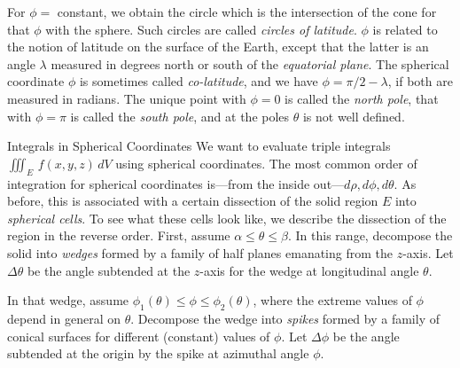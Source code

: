 For $\phi = $ constant, we obtain the circle which is the
intersection of the cone for that $\phi$ with the sphere.
Such circles are called {\it circles of latitude}.
%
%
$\phi$ is related to the notion of latitude on the surface
of the Earth, except that the latter is an angle $\lambda$
 measured
in degrees north or south of the {\it equatorial plane}.  The
spherical coordinate $\phi$ is sometimes called {\it co-latitude\/},
and we have $\phi = \pi/2 - \lambda$, if both are measured in
radians.  The unique point with $\phi = 0$ is called the
{\it north pole\/}, that with $\phi = \pi$ is called the
{\it south pole\/}, and at the  poles $\theta$ is not well defined.
\medskip
\centerline{}
\medskip
\subhead Integrals in Spherical Coordinates \endsubhead
We want to evaluate  triple integrals $\iiint_E\,f(x,y,z)\,dV$
using spherical coordinates.
The most common order of integration for spherical coordinates
is---from the inside out---$d\rho, d\phi, d\theta$.  
As before, this is associated with a certain dissection of the
solid region $E$ into {\it spherical cells}.  To see what these
cells look like, we describe the dissection of the region in
the reverse order.   First, assume $\alpha \le \theta \le \beta$.
In this range, decompose the solid  into {\it wedges\/}
formed by a family of half planes emanating from the $z$-axis.
Let $\Delta\theta$ be the angle subtended at the $z$-axis for the
wedge at longitudinal
angle $\theta$.
\medskip
\centerline{}
\medskip
In that wedge, assume 
$\phi_1(\theta)\le \phi \le \phi_2(\theta)$, where the
extreme values of $\phi$ depend in general
on $\theta$.  Decompose the wedge into {\it spikes\/} formed
by a family of conical surfaces for different (constant) values
of $\phi$.  Let $\Delta \phi$ be the angle subtended at the
origin by the spike at azimuthal angle $\phi$.

